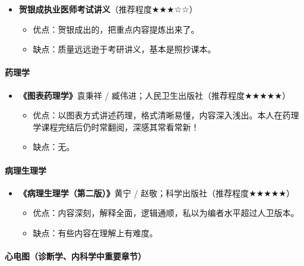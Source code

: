 \documentclass[zihao=-4,fontset=none]{Beautybook-CN}
\begin{document}
\begin{itemize}
	\item \textbf{贺银成执业医师考试讲义}（推荐程度${\bigstar}$${\bigstar}$${\bigstar}$☆☆）
	      \begin{itemize}
	      	\item 优点：贺银成出的，把重点内容提炼出来了。
	      	\item 缺点：质量远远逊于考研讲义，基本是照抄课本。
	      \end{itemize}
	      	      
\end{itemize}
\paragraph{\textbf{药理学}}


\begin{itemize}
	\item \textbf{《图表药理学》}袁秉祥 / 臧伟进；人民卫生出版社（推荐程度${\bigstar}$${\bigstar}$${\bigstar}$${\bigstar}$${\bigstar}$）
	      \begin{itemize}
	      	\item 优点：以图表方式讲述药理，格式清晰易懂，内容深入浅出。本人在药理学课程完结后仍时常翻阅，深感其常看常新！
	      	\item 缺点：无。
	      \end{itemize}
	      	      
\end{itemize}
\paragraph{\textbf{病理生理学}}


\begin{itemize}
	\item \textbf{《病理生理学（第二版）》}黄宁 / 赵敬；科学出版社（推荐程度${\bigstar}$${\bigstar}$${\bigstar}$${\bigstar}$${\bigstar}$）
	      \begin{itemize}
	      	\item 优点：内容深刻，解释全面，逻辑通顺，私以为编者水平超过人卫版本。
	      	\item 缺点：有些内容在理解上有难度。
	      \end{itemize}
	      	      
\end{itemize}
\paragraph{\textbf{心电图（诊断学、内科学中重要章节）}}
\end{document}
